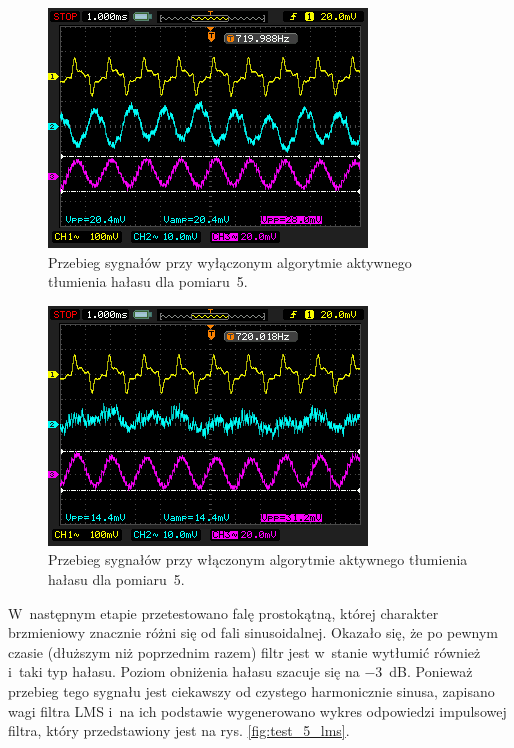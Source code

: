 \begin{enumerate}
	\begin{figure}[h!]
		\centering
		\includegraphics[scale=0.7]{../Assets/Results/5_720_3_sq_off.png}
		\caption{Przebieg sygnałów przy wyłączonym algorytmie aktywnego tłumienia hałasu dla pomiaru~5.}
		\label{fig:test_5_off}
	\end{figure}
	\begin{figure}[h!]
		\centering
		\includegraphics[scale=0.7]{../Assets/Results/5_720_3_sq_on.png}
		\caption{Przebieg sygnałów przy włączonym algorytmie aktywnego tłumienia hałasu dla pomiaru~5.}
		\label{fig:test_5_on}
	\end{figure}
	W~następnym etapie przetestowano falę prostokątną, której charakter brzmieniowy znacznie różni się od fali sinusoidalnej. Okazało się, że po pewnym czasie (dłuższym niż poprzednim razem) filtr jest w~stanie wytłumić również i~taki typ hałasu. Poziom obniżenia hałasu szacuje się na \SI{-3}{\dB}. Ponieważ przebieg tego sygnału jest ciekawszy od czystego harmonicznie sinusa, zapisano wagi filtra LMS i~na ich podstawie wygenerowano wykres odpowiedzi impulsowej filtra, który przedstawiony jest na rys. \ref{fig:test_5_lms}.
	\begin{figure}[h!]
		\centering

\end{figure}
\end{enumerate}
